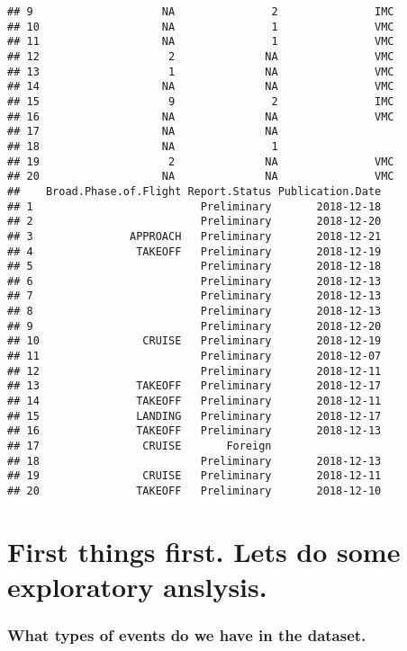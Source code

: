 \documentclass[]{article}
\begin{document}
\begin{verbatim}
## 9                    NA               2               IMC
## 10                   NA               1               VMC
## 11                   NA               1               VMC
## 12                    2              NA               VMC
## 13                    1              NA               VMC
## 14                   NA              NA               VMC
## 15                    9               2               IMC
## 16                   NA              NA               VMC
## 17                   NA              NA                  
## 18                   NA               1                  
## 19                    2              NA               VMC
## 20                   NA              NA               VMC
##    Broad.Phase.of.Flight Report.Status Publication.Date
## 1                          Preliminary       2018-12-18
## 2                          Preliminary       2018-12-20
## 3               APPROACH   Preliminary       2018-12-21
## 4                TAKEOFF   Preliminary       2018-12-19
## 5                          Preliminary       2018-12-18
## 6                          Preliminary       2018-12-13
## 7                          Preliminary       2018-12-13
## 8                          Preliminary       2018-12-13
## 9                          Preliminary       2018-12-20
## 10                CRUISE   Preliminary       2018-12-19
## 11                         Preliminary       2018-12-07
## 12                         Preliminary       2018-12-11
## 13               TAKEOFF   Preliminary       2018-12-17
## 14               TAKEOFF   Preliminary       2018-12-11
## 15               LANDING   Preliminary       2018-12-17
## 16               TAKEOFF   Preliminary       2018-12-13
## 17                CRUISE       Foreign                 
## 18                         Preliminary       2018-12-13
## 19                CRUISE   Preliminary       2018-12-11
## 20               TAKEOFF   Preliminary       2018-12-10
\end{verbatim}

\hypertarget{first-things-first.-lets-do-some-exploratory-anslysis.}{%
\section{First things first. Lets do some exploratory
anslysis.}\label{first-things-first.-lets-do-some-exploratory-anslysis.}}

\hypertarget{what-types-of-events-do-we-have-in-the-dataset.}{%
\subsubsection{What types of events do we have in the
dataset.}\label{what-types-of-events-do-we-have-in-the-dataset.}}
\end{document}
